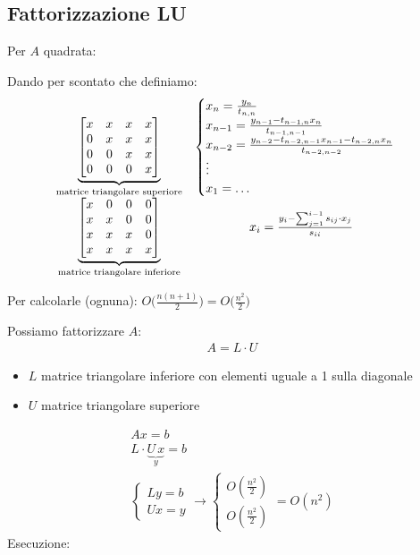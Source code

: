 \documentclass[a4paper,12pt]{article}
\begin{document}
\begin{itemize}
    \subsection{Fattorizzazione LU}
    Per $A$ quadrata:
\begin{tcolorbox}[colback=blue!5!white, colframe=blue!75!black]
Dando per scontato che definiamo:
\[
\begin{array}{c c}
\underbrace{
\begin{bmatrix}
 x & x & x & x \\
 0 & x & x & x \\
 0 & 0 & x & x \\
 0 & 0 & 0 & x
\end{bmatrix}}_{\text{matrice triangolare superiore}}
&
\begin{cases}
x_n = \frac{y_n}{t_{n,n}} \\
x_{n-1} = \frac{y_{n-1}- t_{n-1,n} x_n}{t_{n-1, n-1}} \\
x_{n-2} = \frac{y_{n-2}- t_{n-2,n-1} x_{n-1} - t_{n-2,n} x_n}{t_{n-2, n-2}} \\
\vdots  \\
x_1 = \dots
\end{cases}
\\[3em]
\underbrace{
\begin{bmatrix}
 x & 0 & 0 & 0 \\
 x & x & 0 & 0 \\
 x & x & x & 0 \\
 x & x & x & x
\end{bmatrix}}_{\text{matrice triangolare inferiore}}
&
x_i = \frac{y_i - \sum_{j=1}^{i-1}s_{ij}\cdot x_j}{s_{ii}}
\end{array}
\]

Per calcolarle (ognuna): $O\Big(\frac{n(n+1)}{2}\Big) = O\Big(\frac{n^2}{2}\Big)$
\end{tcolorbox}

Possiamo fattorizzare $A$:
\begin{align*}
    A = L \cdot U
\end{align*}
\begin{itemize}
    \item $L$ matrice triangolare inferiore con elementi uguale a 1 sulla diagonale
    \item $U$ matrice triangolare superiore
\end{itemize}
\begin{align*}
    Ax=b \\
    L\cdot \underbrace{U \, x}_y = b \\
    \boxed{\begin{cases}
        Ly=b \\
        Ux=y
    \end{cases} }
    \rightarrow
    \begin{cases}
        O(\frac{n^2}{2}) \\
        O(\frac{n^2}{2})
    \end{cases}
    = O(n^2)
\end{align*}
Esecuzione: \\


\end{itemize}
\end{document}
